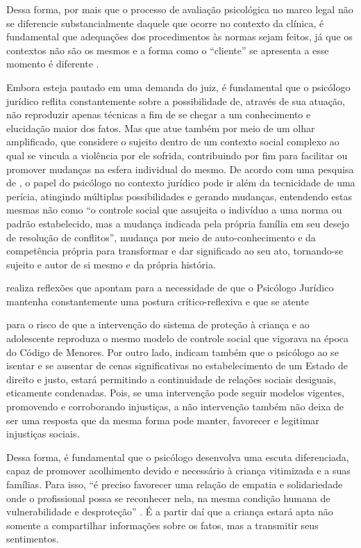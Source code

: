 Dessa forma, por mais que o processo de avaliação psicológica no marco legal não se diferencie substancialmente daquele que ocorre no contexto da clínica, é fundamental que adequações dos procedimentos às normas sejam feitos, já que os contextos não são os mesmos e a forma como o ``cliente'' se apresenta a esse momento é diferente \cite[p. 42]{ROVINSKI2004}.

Embora esteja pautado em uma demanda do juiz, é fundamental que o psicólogo jurídico reflita constantemente sobre a possibilidade de, através de sua atuação, não reproduzir apenas técnicas a fim de se chegar a um conhecimento e elucidação maior dos fatos. Mas que atue também por meio de um olhar amplificado, que considere o sujeito dentro de um contexto social complexo ao qual se vincula a violência por ele sofrida, contribuindo por fim para facilitar ou promover mudanças na esfera individual do mesmo. De acordo com uma pesquisa de , o papel do psicólogo no contexto jurídico pode ir além da tecnicidade de uma perícia, atingindo múltiplas possibilidades e gerando mudanças, entendendo estas mesmas não como ``o controle social que assujeita o indivíduo a uma norma ou padrão estabelecido, mas a mudança indicada pela própria família em seu desejo de resolução de conflitos'', mudança por meio de auto-conhecimento e da competência própria para transformar e dar significado ao seu ato, tornando-se sujeito e autor de si mesmo e da própria história. 

 realiza reflexões que apontam para a necessidade de que o Psicólogo Jurídico mantenha constantemente uma postura crítico-reflexiva e que se atente  

\begin{citacao}
	para o risco de que a intervenção do sistema de proteção à criança e ao adolescente reproduza o mesmo modelo de controle social que vigorava na época do Código de Menores. Por outro lado, indicam também que o psicólogo ao se isentar e se ausentar de cenas significativas no estabelecimento de um Estado de direito e justo, estará permitindo a continuidade de relações sociais desiguais, eticamente condenadas. Pois, se uma intervenção pode seguir modelos vigentes, promovendo e corroborando injustiças, a não intervenção também não deixa de ser uma resposta que da mesma forma pode manter, favorecer e legitimar injustiças sociais.
\end{citacao}

Dessa forma, é fundamental que o psicólogo desenvolva uma escuta diferenciada, capaz de promover acolhimento devido e necessário à criança vitimizada e a suas famílias. Para isso, ``é preciso favorecer uma relação de empatia e solidariedade onde o profissional possa se reconhecer nela, na mesma condição humana de vulnerabilidade e desproteção'' \cite[p. 25]{SANTOS2009}. É a partir daí que a criança estará apta não somente a compartilhar informações sobre os fatos, mas a transmitir seus sentimentos. 

